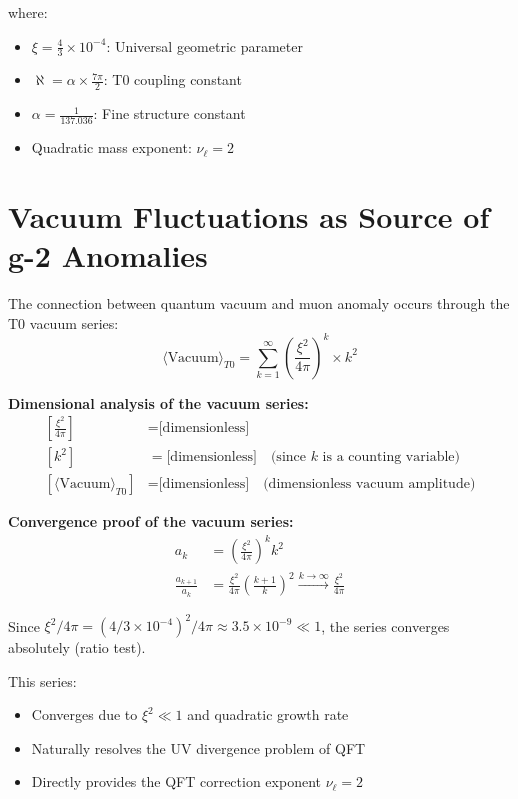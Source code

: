 \documentclass[12pt,a4paper]{article}
\begin{document}
	where:
	\begin{itemize}
		\item $\xi = \frac{4}{3} \times 10^{-4}$: Universal geometric parameter
		\item $\aleph = \alpha \times \frac{7\pi}{2}$: T0 coupling constant  
		\item $\alpha = \frac{1}{137.036}$: Fine structure constant
		\item Quadratic mass exponent: $\nu_\ell = 2$
	\end{itemize}
	
	\section{Vacuum Fluctuations as Source of g-2 Anomalies}
	
	The connection between quantum vacuum and muon anomaly occurs through the T0 vacuum series:
	\begin{equation}
		\langle \text{Vacuum} \rangle_{T0} = \sum_{k=1}^{\infty} \left(\frac{\xi^2}{4\pi}\right)^k \times k^{2}
	\end{equation}
	
	\begin{units}
		\textbf{Dimensional analysis of the vacuum series:}
		\begin{align}
			\left[\frac{\xi^2}{4\pi}\right] &= \text{[dimensionless]} \\
			[k^{2}] &= \text{[dimensionless]} \quad \text{(since } k \text{ is a counting variable)} \\
			[\langle \text{Vacuum} \rangle_{T0}] &= \text{[dimensionless]} \quad \text{(dimensionless vacuum amplitude)}
		\end{align}
	\end{units}
	
	\textbf{Convergence proof of the vacuum series:}
	\begin{align}
		a_k &= \left(\frac{\xi^2}{4\pi}\right)^k k^{2} \\
		\frac{a_{k+1}}{a_k} &= \frac{\xi^2}{4\pi} \left(\frac{k+1}{k}\right)^{2} \xrightarrow{k \to \infty} \frac{\xi^2}{4\pi}
	\end{align}
	
	Since $\xi^2/4\pi = (4/3 \times 10^{-4})^2/4\pi \approx 3.5 \times 10^{-9} \ll 1$, the series converges absolutely (ratio test).
	
	This series:
	\begin{itemize}
		\item Converges due to $\xi^2 \ll 1$ and quadratic growth rate
		\item Naturally resolves the UV divergence problem of QFT
		\item Directly provides the QFT correction exponent $\nu_\ell = 2$
	\end{itemize}
	
\end{document}
